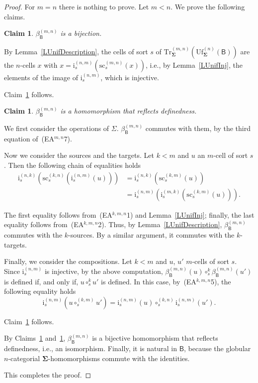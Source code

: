 \documentclass[a4paper, reqno
]{amsart}
\newcommand{\sig}[1]{\mathbf{#1}}             %
\newcommand{\calg}[1]{\boldsymbol{\mathsf{#1}}} %
\newcommand{\src}{\mathrm{sc}}
\newcommand{\Uf}{\mathrm{Uf}}
\newcommand{\Tr}{\mathrm{Tr}}
\theoremstyle{plain}
\newtheorem{claim}[theorem]{Claim}
\theoremstyle{definition}
\begin{document}
\begin{proof}
For $m=n$ there is nothing to prove.
Let $m<n$.
We prove the following claims.

\begin{claim}\label{CCompatUfTrA}
$\beta^{(m,n)}_{\calg{B}}$ is a bijection.
\end{claim}

By Lemma~\ref{LUnifDescription}, the cells of sort $s$ of $\Tr^{(m,n)}_{\sig{\Sigma}}(\Uf^{(n)}_{\sig{\Sigma}}(\calg{B}))$ are the $n$-cells $x$ with $x=\mathrm{i}^{(n,m)}_{s}(\src^{(m,n)}_{s}(x))$, i.e., by Lemma~\ref{LUnifInj}, the elements of the image of $\mathrm{i}^{(n,m)}_{s}$, which is injective.

Claim~\ref{CCompatUfTrA} follows.

\begin{claim}\label{CCompatUfTrB}
$\beta^{(m,n)}_{\calg{B}}$ is a homomorphism that reflects definedness.
\end{claim}

We first consider the operations of $\Sigma$.
$\beta^{(m,n)}_{\calg{B}}$ commutes with them, by the third equation of~(EA$^{m,n}$7).

Now we consider the sources and the targets.
Let $k<m$ and $u$ an $m$-cell of sort $s$.
Then the following chain of equalities holds
\begin{align*}
\mathrm{i}^{(n,k)}_{s}\left(\src^{(k,n)}_{s}\left(\mathrm{i}^{(n,m)}_{s}(u)\right)\right)
&=
\mathrm{i}^{(n,k)}_{s}\left(\src^{(k,m)}_{s}(u)\right)
\tag{1}
\\&=
\mathrm{i}^{(n,m)}_{s}\left(\mathrm{i}^{(m,k)}_{s}\left(\src^{(k,m)}_{s}(u)\right)\right).
\tag{2}
\end{align*}

The first equality follows from~(EA$^{k,m,n}$1) and Lemma~\ref{LUnifInj}; finally, the last equality follows from~(EA$^{k,m,n}$2).
Thus, by Lemma~\ref{LUnifDescription}, $\beta^{(m,n)}_{\calg{B}}$ commutes with the $k$-sources.
By a similar argument, it commutes with the $k$-targets.

Finally, we consider the compositions.
Let $k<m$ and $u$, $u'$ $m$-cells of sort $s$.
Since $\mathrm{i}^{(n,m)}_{s}$ is injective, by the above computation, $\beta^{(m,n)}_{\calg{B}}(u)\circ^{k}_{s}\beta^{(m,n)}_{\calg{B}}(u')$ is defined if, and only if, $u\circ^{k}_{s}u'$ is defined.
In this case, by~(EA$^{k,m,n}$5), the following equality holds
$$
\mathrm{i}^{(n,m)}_{s}\left(u\circ^{(k,m)}_{s}u'\right)=\mathrm{i}^{(n,m)}_{s}(u)\circ^{(k,n)}_{s}\mathrm{i}^{(n,m)}_{s}(u').
$$

Claim~\ref{CCompatUfTrB} follows.

By Claims~\ref{CCompatUfTrA} and~\ref{CCompatUfTrB}, $\beta^{(m,n)}_{\calg{B}}$ is a bijective homomorphism that reflects definedness, i.e., an isomorphism.
Finally, it is natural in $\calg{B}$, because the globular $n$-categorial $\sig{\Sigma}$-homomorphisms commute with the identities.

This completes the proof.
\end{proof}
\end{document}

